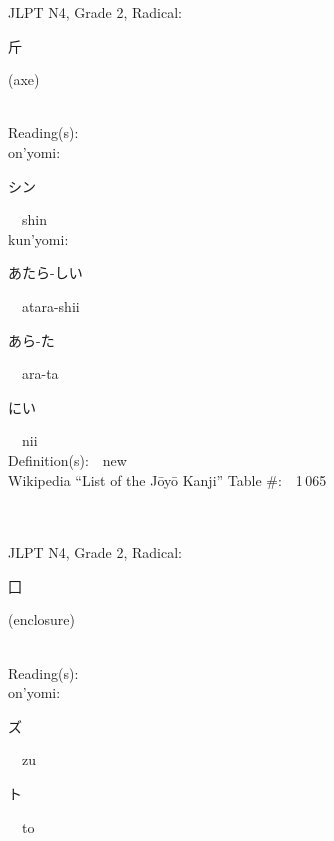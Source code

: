 \begin{multicols}{2}
{JLPT N4, Grade 2, Radical:\ \ {\begin{CJK}{UTF8}{min} 斤 \end{CJK}} (axe) } \\
Reading(s):\ \ \\
{\hspace*{1em}}on'yomi:\ \ \\
{\hspace*{2em}}{\begin{CJK}{UTF8}{min} シン \end{CJK}}\ \ shin\ \ \\
{\hspace*{1em}}kun'yomi:\ \ \\
{\hspace*{2em}}{\begin{CJK}{UTF8}{min} あたら-しい \end{CJK}}\ \ atara-shii\ \ \\
{\hspace*{2em}}{\begin{CJK}{UTF8}{min} あら-た \end{CJK}}\ \ ara-ta\ \ \\
{\hspace*{2em}}{\begin{CJK}{UTF8}{min} にい \end{CJK}}\ \ nii\ \ \\
Definition(s):\ \ new \\
Wikipedia ``List of the J\=oy\=o Kanji'' Table \#:\ \ 1\,065 \\
\ \ \\
{\fontsize{34pt}{40pt}  }\ \ \\  %
{JLPT N4, Grade 2, Radical:\ \ {\begin{CJK}{UTF8}{min} 囗 \end{CJK}} (enclosure) } \\
Reading(s):\ \ \\
{\hspace*{1em}}on'yomi:\ \ \\
{\hspace*{2em}}{\begin{CJK}{UTF8}{min} ズ \end{CJK}}\ \ zu\ \ \\
{\hspace*{2em}}{\begin{CJK}{UTF8}{min} ト \end{CJK}}\ \ to\ \ \\

\end{multicols}
